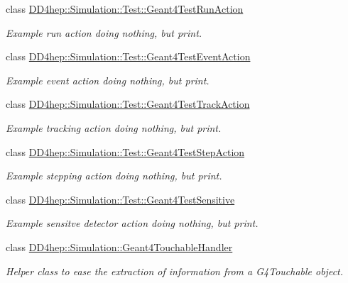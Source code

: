 \begin{DoxyCompactItemize}
class \hyperlink{class_d_d4hep_1_1_simulation_1_1_test_1_1_geant4_test_run_action}{DD4hep::Simulation::Test::Geant4TestRunAction}
\begin{DoxyCompactList}\small\item\em Example run action doing nothing, but print. \item\end{DoxyCompactList}\item 
class \hyperlink{class_d_d4hep_1_1_simulation_1_1_test_1_1_geant4_test_event_action}{DD4hep::Simulation::Test::Geant4TestEventAction}
\begin{DoxyCompactList}\small\item\em Example event action doing nothing, but print. \item\end{DoxyCompactList}\item 
class \hyperlink{class_d_d4hep_1_1_simulation_1_1_test_1_1_geant4_test_track_action}{DD4hep::Simulation::Test::Geant4TestTrackAction}
\begin{DoxyCompactList}\small\item\em Example tracking action doing nothing, but print. \item\end{DoxyCompactList}\item 
class \hyperlink{class_d_d4hep_1_1_simulation_1_1_test_1_1_geant4_test_step_action}{DD4hep::Simulation::Test::Geant4TestStepAction}
\begin{DoxyCompactList}\small\item\em Example stepping action doing nothing, but print. \item\end{DoxyCompactList}\item 
class \hyperlink{class_d_d4hep_1_1_simulation_1_1_test_1_1_geant4_test_sensitive}{DD4hep::Simulation::Test::Geant4TestSensitive}
\begin{DoxyCompactList}\small\item\em Example sensitve detector action doing nothing, but print. \item\end{DoxyCompactList}\item 
class \hyperlink{class_d_d4hep_1_1_simulation_1_1_geant4_touchable_handler}{DD4hep::Simulation::Geant4TouchableHandler}
\begin{DoxyCompactList}\small\item\em Helper class to ease the extraction of information from a G4Touchable object. \item\end{DoxyCompactList}\item 

\end{DoxyCompactItemize}
